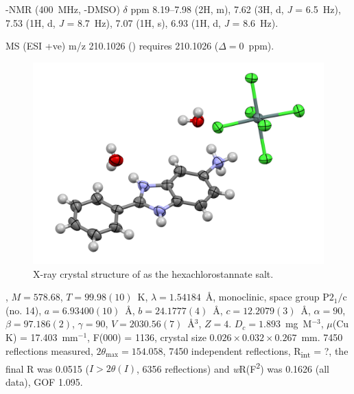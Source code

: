 \begin{refsection}
-NMR (400~MHz, -DMSO) $\delta$ ppm 8.19--7.98 (2H, m), 7.62 (3H, d, \textit{J} = 6.5~Hz), 7.53 (1H, d, \textit{J} = 8.7~Hz), 7.07 (1H, s), 6.93 (1H, d, \textit{J} = 8.6~Hz). %

MS (ESI +ve) m/z 210.1026 ()  requires 210.1026 ($\Delta=0$~ppm).

\begin{figure}[ht]
    \centering
    \includegraphics[width=0.8\linewidth]{Figures/rhs-amine-xray.pdf}
    \caption{X-ray crystal structure of  as the hexachlorostannate salt.}\label{fig:rhs-amine-xray}
\end{figure}

, $M=578.68$, $T=99.98(10)$~K, $\lambda=1.54184$~\AA, monoclinic, space group $\text{P}2_1/\text{c}$ (no. 14), $a = 6.93400(10)$~\AA, $b = 24.1777(4)$~\AA, $c = 12.2079(3)$~\AA, $\alpha = 90$\degree, $\beta = 97.186(2)$\degree, $\gamma = 90$\degree, $V = 2030.56(7)$~\AA$^{3}$, $Z = 4$. $D_{c}= 1.893$~mg~M$^{-3}$, $\mu$(Cu K\a) = 17.403~mm$^{-1}$, F(000) = 1136, crystal size $0.026 \times 0.032 \times 0.267$~mm. 7450 reflections measured, $2\theta_{\max}=154.058$\degree, 7450 independent reflections, R\textsubscript{int} = ?, the final R was 0.0515 ($I > 2\theta(I)$, 6356 reflections) and \emph{w}R(F\textsuperscript{2}) was 0.1626 (all data), GOF 1.095. 


\end{refsection}
